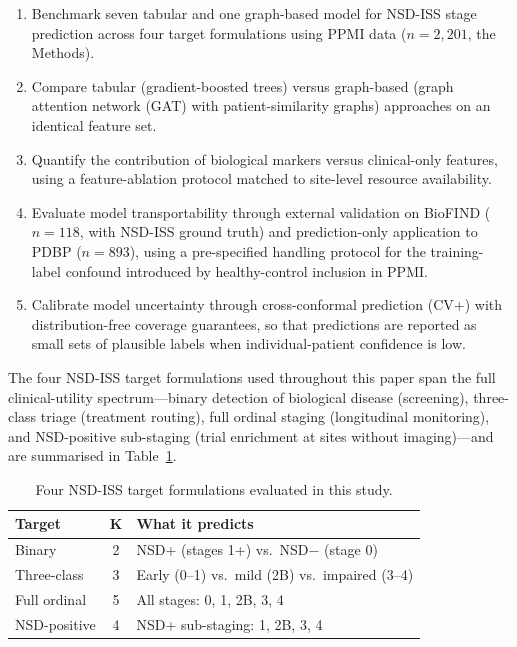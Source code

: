 \documentclass[10pt,letterpaper]{article}
\begin{document}
\begin{enumerate}
    \item Benchmark seven tabular and one graph-based model for NSD-ISS stage prediction across four target formulations using PPMI data ($n{=}2{,}201$, the Methods).
    \item Compare tabular (gradient-boosted trees) versus graph-based (graph attention network (GAT) with patient-similarity graphs) approaches on an identical feature set.
    \item Quantify the contribution of biological markers versus clinical-only features, using a feature-ablation protocol matched to site-level resource availability.
    \item Evaluate model transportability through external validation on BioFIND ($n{=}118$, with NSD-ISS ground truth) and prediction-only application to PDBP ($n{=}893$), using a pre-specified handling protocol for the training-label confound introduced by healthy-control inclusion in PPMI.
    \item Calibrate model uncertainty through cross-conformal prediction (CV+) with distribution-free coverage guarantees, so that predictions are reported as small sets of plausible labels when individual-patient confidence is low.
\end{enumerate}

\noindent The four NSD-ISS target formulations used throughout this paper span the full clinical-utility spectrum---binary detection of biological disease (screening), three-class triage (treatment routing), full ordinal staging (longitudinal monitoring), and NSD-positive sub-staging (trial enrichment at sites without imaging)---and are summarised in Table~\ref{p1:tab:targets}.

\begin{table}[t]
\centering
\caption{Four NSD-ISS target formulations evaluated in this study.}
\label{p1:tab:targets}
\scriptsize
\setlength{\tabcolsep}{3pt}
\begin{tabular}{@{}lcp{4.2cm}@{}}
\toprule
\textbf{Target} & \textbf{K} & \textbf{What it predicts} \\
\midrule
Binary       & 2 & NSD+ (stages 1+) vs.\ NSD$-$ (stage 0) \\
Three-class  & 3 & Early (0--1) vs.\ mild (2B) vs.\ impaired (3--4) \\
Full ordinal & 5 & All stages: 0, 1, 2B, 3, 4 \\
NSD-positive & 4 & NSD+ sub-staging: 1, 2B, 3, 4 \\
\bottomrule
\end{tabular}
\end{table}
\end{document}
